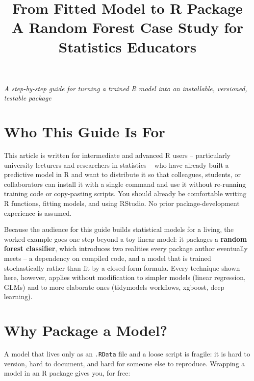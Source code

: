 \documentclass[11pt]{article}
\title{\vspace{-2cm}\textbf{\Huge From Fitted Model to R Package}\\[6pt]
\Large A Random Forest Case Study for Statistics Educators}
\author{}
\date{}
\begin{document}
\maketitle
\vspace{-1.7cm}

\begin{center}
\textcolor{rgray}{\textit{A step-by-step guide for turning a trained R model into an installable, versioned, testable package}}
\end{center}

\vspace{0.4cm}

\section*{Who This Guide Is For}
This article is written for intermediate and advanced R users -- particularly university lecturers and researchers in statistics -- who have already built a predictive model in R and want to distribute it so that colleagues, students, or collaborators can install it with a single command and use it without re-running training code or copy-pasting scripts. You should already be comfortable writing R functions, fitting models, and using RStudio. No prior package-development experience is assumed.

Because the audience for this guide builds statistical models for a living, the worked example goes one step beyond a toy linear model: it packages a \textbf{random forest classifier}, which introduces two realities every package author eventually meets -- a dependency on compiled code, and a model that is trained stochastically rather than fit by a closed-form formula. Every technique shown here, however, applies without modification to simpler models (linear regression, GLMs) and to more elaborate ones (tidymodels workflows, xgboost, deep learning).

\tableofcontents

\section{Why Package a Model?}

A model that lives only as an \texttt{.RData} file and a loose script is fragile: it is hard to version, hard to document, and hard for someone else to reproduce. Wrapping a model in an R package gives you, for free:
\end{document}
